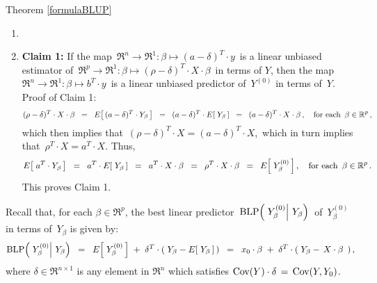 \proofof Theorem \ref{formulaBLUP}
\begin{enumerate}
\item
\item
	\vskip 0.3cm
	\noindent
	\textbf{Claim 1:}\quad
	If the map
	\,$\Re^{n} \longrightarrow \Re^{1} : \beta \longmapsto (a - \delta)^{T}\cdot y$\,
	is a linear unbiased estimator of 
	\,$\Re^{p} \longrightarrow \Re^{1} : \beta \longmapsto (\rho - \delta)^{T} \cdot X \cdot \beta$\,
	in terms of $Y$,
	then the map
	\,$\Re^{n} \longrightarrow \Re^{1} : \beta \longmapsto b^{T}\cdot y$\,
	is a linear unbiased predictor of \,$Y^{(0)}$ in terms of \,$Y$.
	\vskip 0.2cm
	\noindent
	Proof of Claim 1:\quad
	\begin{equation*}
	(\rho - \delta)^{T} \cdot X \cdot \beta
	\;\; = \;\;
		E\!\left[\,(a - \delta)^{T}\cdot Y_{\beta}\,\right]
	\;\; = \;\;
		(a - \delta)^{T} \cdot E\!\left[\;Y_{\beta}\,\right]
	\;\; = \;\;
		(a - \delta)^{T} \cdot X \cdot \beta\,,
	\quad
	\textnormal{for each \,$\beta \in \Re^{p}$}\,,
	\end{equation*}
	which then implies that \,$(\rho - \delta)^{T} \cdot X  = (a - \delta)^{T} \cdot X$,\,
	which in turn implies that \,$\rho^{T} \cdot X  = a^{T} \cdot X$.
	Thus,
	\begin{equation*}
	E\!\left[\;a^{T} \cdot Y_{\beta}\,\right]
	\;\; = \;\;
		a^{T} \cdot E\!\left[\;Y_{\beta}\,\right]
	\;\; = \;\;
		a^{T} \cdot X \cdot \beta
	\;\; = \;\;
		\rho^{T} \cdot X \cdot \beta
	\;\; = \;\;
		E\!\left[\;Y^{(0)}_{\beta}\,\right],
	\quad\textnormal{for each \,$\beta \in \Re^{p}$}\,.
	\end{equation*}
	This proves Claim 1.
\end{enumerate}


\vskip 0.5cm
\noindent
Recall that, for each $\beta \in \Re^{p}$, the best linear predictor
\,$\blp\!\left(\,\left.Y^{(0)}_{\beta}\right\vert\,Y_{\beta}\right)$\, of
\,$Y^{(0)}_{\beta}$ in terms of \,$Y_{\beta}$ is given by:
\begin{equation*}
\blp\!\left(\,\left.Y^{(0)}_{\beta}\right\vert\,Y_{\beta}\right)
\;\; = \;\;
	E\!\left[\;Y^{(0)}_{\beta}\,\right] \; + \; \delta^{T}\cdot(\;Y_{\beta} - E\!\left[\;Y_{\beta}\,\right]\,)
\;\; = \;\;
	x_{0}\cdot\beta \; + \; \delta^{T}\cdot(\;Y_{\beta} - \,X\cdot\beta\,\;)\,,
\end{equation*}
where $\delta \in \Re^{n \times 1}$ is any element in $\Re^{n}$ which satisfies
$\Cov(Y) \cdot \delta \,=\, \Cov(Y,Y_{0})$.

